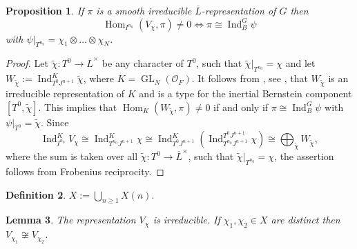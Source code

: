 \documentclass[JEP,XML,SOM,Unicode,NoEqCountersInSection]{cedram}
\let\mathcal\mathscr
\newtheorem{prop}{Proposition}[section]
\newtheorem{lem}[prop]{Lemma}
\theoremstyle{definition}
\newtheorem{defi}[prop]{Definition}
\DeclareMathOperator{\Hom}{Hom}
\DeclareMathOperator{\Ind}{Ind}
\DeclareMathOperator{\GL}{GL}
\newcommand{\Indu}[3]{\Ind_{#1}^{#2}{#3}}
\newcommand{\cO}{\mathcal{O}}
\newcommand{\Lbar}{\overline{L}}
\begin{document}
\begin{prop}\label{types_prince} If $\pi$ is a smooth irreducible $\Lbar$-representation of $G$ then
\[
\Hom_{I^{n_0}}( V_{\chi}, \pi)\neq 0 \iff\pi\cong \Indu{B}{G}{\psi}
\]
with $\psi|_{T^{n_0}}= \chi_1\otimes\ldots\otimes \chi_N$.
\end{prop}

\begin{proof} Let $\tilde{\chi}: T^0\to \Lbar^{\times}$ be any character of $T^0$, such that $\tilde{\chi}|_{T^{n_0}}=\chi$ and let $W_{\tilde{\chi}}:=\Indu{T^0 J^{n+1}}{K}{\tilde{\chi}}$,
where $K=\GL_N(\cO_F)$. It follows from \cite{BK_cover}, see \cite[Prop.\,3.10]{HS}, that $W_{\tilde{\chi}}$ is an irreducible representation of $K$ and is a type for the inertial Bernstein
component $[T^0, \tilde{\chi}]$. This implies that $\Hom_{K}(W_{\tilde{\chi}}, \pi)\neq 0$ if and only if $\pi\cong \Indu{B}{G}{\psi}$ with $\psi|_{T^{0}}= \tilde{\chi}$. Since
\begin{equation}\label{induce_up}
\Indu{I^{n_0}}{K}{V_\chi}\cong \Indu{T^{n_0} J^{n+1}}{K}{\chi}\cong \Indu{T^0J^{n+1}}{K}{(\Indu{T^{n_0} J^{n+1}}{T^0 J^{n+1}}{\chi})}\cong \bigoplus_{\tilde{\chi}} W_{\tilde{\chi}},
\end{equation}
where the sum is taken over all $\tilde{\chi}: T^0\to \Lbar^{\times}$, such that $\tilde{\chi}|_{T^{n_0}}= \chi$, the assertion follows from Frobenius reciprocity.
\end{proof}

\begin{defi} $X:= \bigcup_{n\ge 1} X(n)$.
\end{defi}

\begin{lem}\label{irreducible_distinct} The representation $V_{\chi}$ is irreducible. If $\chi_1, \chi_2\in X$ are distinct then $V_{\chi_1}\not \cong V_{\chi_2}$.
\end{lem}
\end{document}
